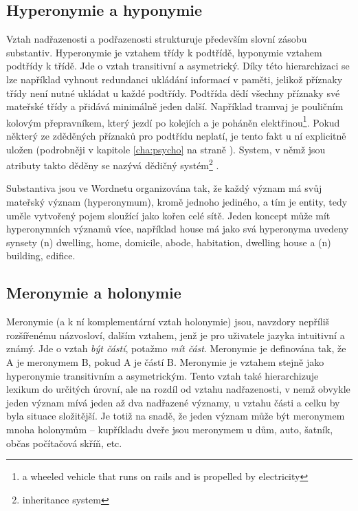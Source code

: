 \documentclass[a4paper, 11pt, oneside]{book}
\newcommand\ex{\textsf}
\begin{document}

				
				\subsection{Hyperonymie a hyponymie}
				\label{cha:hyperohyp}

					Vztah nadřazenosti a podřazenosti strukturuje především slovní zásobu substantiv. Hyperonymie je vztahem třídy k podtřídě, hyponymie vztahem podtřídy k třídě. Jde o vztah transitivní a asymetrický. \parencite{miller1990introduction} Díky této hierarchizaci se lze například vyhnout redundanci ukládání informací v paměti, jelikož příznaky třídy není nutné ukládat u každé podtřídy. Podtřída dědí všechny příznaky své mateřské třídy a přidává minimálně jeden další. Například \ex{tramvaj} je \ex{pouličním kolovým přepravníkem, který jezdí po kolejích a je poháněn elektřinou}\footnote{a wheeled vehicle that runs on rails and is propelled by electricity}. Pokud některý ze zděděných příznaků pro podtřídu neplatí, je tento fakt u ní explicitně uložen (podrobněji v kapitole \ref{cha:psycho} na straně \pageref{cha:psycho}). System, v němž jsou atributy takto děděny se nazývá dědičný systém\footnote{inheritance system} \parencite{touretzky1986mathematics}.

					Substantiva jsou ve Wordnetu organizována tak, že každý význam má svůj mateřský význam (hyperonymum), kromě jednoho jediného, a tím je \ex{entity}, tedy uměle vytvořený pojem sloužící jako kořen celé sítě. Jeden koncept může mít hyperonymních významů více, například \ex{house} má jako svá hyperonyma uvedeny synsety \ex{(n) dwelling, home, domicile, abode, habitation, dwelling house} a \ex{(n) building, edifice}.

				\subsection{Meronymie a holonymie}

					Meronymie (a k ní komplementární vztah holonymie) jsou, navzdory nepříliš rozšířenému názvosloví, dalším vztahem, jenž je pro uživatele jazyka intuitivní a známý. Jde o vztah \textit{být částí}, potažmo \textit{mít část}. Meronymie je definována tak, že A je meronymem B, pokud A je částí B. Meronymie je vztahem stejně jako hyperonymie transitivním a asymetrickým. \parencite{cruse1986lexical} Tento vztah také hierarchizuje lexikum do určitých úrovní, ale na rozdíl od vztahu nadřazenosti, v nemž obvykle jeden význam mívá jeden až dva nadřazené významy, u vztahu části a celku by byla situace složitější. Je totiž na snadě, že jeden význam může být meronymem mnoha holonymům -- kupříkladu \ex{dveře} jsou meronymem u \ex{dům}, \ex{auto}, \ex{šatník}, občas \ex{počítačová skříň}, etc. 
\end{document}
